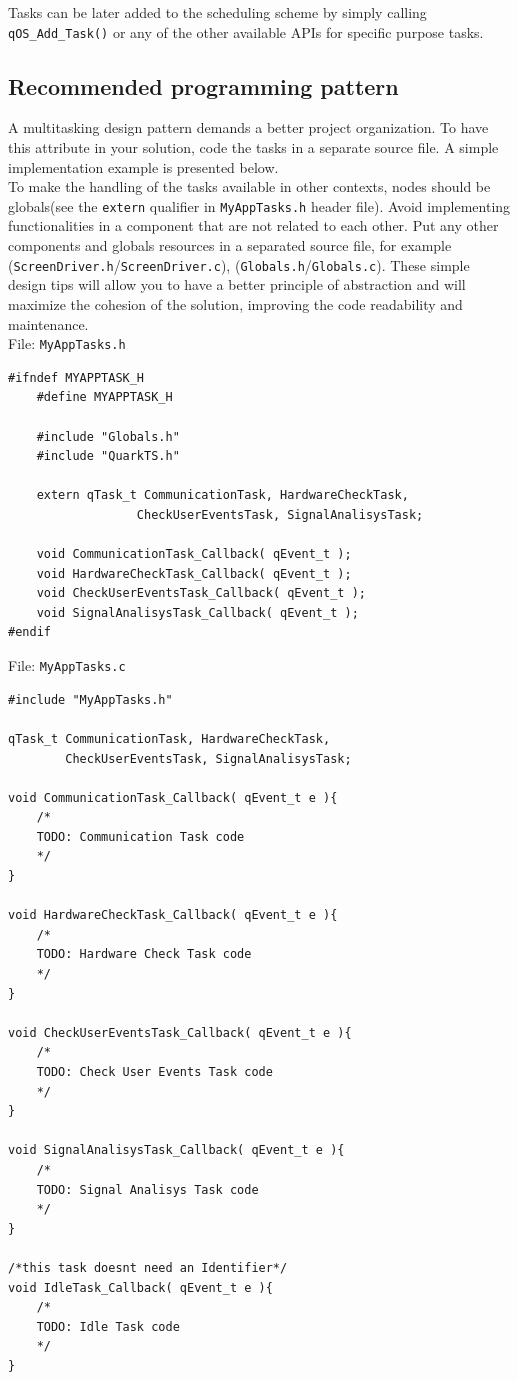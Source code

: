 \documentclass{article}
\begin{document}
Tasks can be later added to the scheduling scheme by simply calling \lstinline{qOS_Add_Task()} or any of the other available APIs for specific purpose tasks.

\subsection{Recommended programming pattern}
A multitasking design pattern demands a better project organization. To have this attribute in your solution, code the tasks in a separate source file. A simple implementation example is presented below. \\

To make the handling of the tasks available in other contexts, nodes should be globals(see the \lstinline{extern} qualifier in \lstinline{MyAppTasks.h} header file).  Avoid implementing functionalities in a component that are not related to each other. Put any other components and globals resources in a separated source file, for example (\lstinline{ScreenDriver.h}/\lstinline{ScreenDriver.c}),  (\lstinline{Globals.h}/\lstinline{Globals.c}). These simple design tips will allow you to have a better principle of abstraction and will maximize the cohesion of the solution, improving the code readability and maintenance. \\

File: \lstinline{MyAppTasks.h}
\begin{lstlisting}[style=CStyle]
#ifndef MYAPPTASK_H
    #define MYAPPTASK_H
    
    #include "Globals.h"
    #include "QuarkTS.h"
    
    extern qTask_t CommunicationTask, HardwareCheckTask, 
                  CheckUserEventsTask, SignalAnalisysTask;
    
    void CommunicationTask_Callback( qEvent_t );
    void HardwareCheckTask_Callback( qEvent_t );
    void CheckUserEventsTask_Callback( qEvent_t );
    void SignalAnalisysTask_Callback( qEvent_t );
#endif
\end{lstlisting}

File: \lstinline{MyAppTasks.c}
\begin{lstlisting}[style=CStyle]
#include "MyAppTasks.h"

qTask_t CommunicationTask, HardwareCheckTask, 
        CheckUserEventsTask, SignalAnalisysTask;

void CommunicationTask_Callback( qEvent_t e ){
    /*
    TODO: Communication Task code
    */
}

void HardwareCheckTask_Callback( qEvent_t e ){
    /*
    TODO: Hardware Check Task code
    */
}

void CheckUserEventsTask_Callback( qEvent_t e ){
    /*
    TODO: Check User Events Task code
    */
}

void SignalAnalisysTask_Callback( qEvent_t e ){
    /*
    TODO: Signal Analisys Task code
    */
}

/*this task doesnt need an Identifier*/
void IdleTask_Callback( qEvent_t e ){ 
    /*
    TODO: Idle Task code
    */
}
\end{lstlisting}
\end{document}
